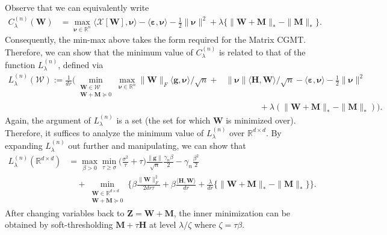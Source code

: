 \documentclass[10pt]{article}
\newcommand{\eps}{\ensuremath{\varepsilon}}
\theoremstyle{definition}
\begin{document}
Observe that we can equivalently write
\begin{align}
    C_{\lambda}^{(n)}(\bm{W}) &=  \max_{\bm{\nu} \in \mathbb{R}^{n}} \langle \mathcal{X}[\bm{W}], \bm{\nu} \rangle - \langle \bm{\eps} , \bm{\nu} \rangle - \frac{1}{2} \| \bm{\nu} \|^2 + \lambda \big\{ \| \bm{W+M} \|_{*} - \|\bm{M}\|_{*}\big\}.
\end{align}
Consequently, the min-max above takes the form required for the Matrix CGMT.  Therefore, 
we can show that the minimum value of $C_{\lambda}^{(n)}$ is related to that of the function $L_{\lambda}^{(n)}$, defined via
\begin{align}
    L_{\lambda}^{(n)}(\mathcal{W}) :=\frac{1}{dr} \bigg( \min_ {\substack{\bm{W}  \in \mathcal{W}\\ \bm{W} + \bm{M} \succcurlyeq 0}} \max_{\bm{\nu} \in \mathbb{R}^n} \| \bm{W} \|_F \langle \bm{g}, \bm{\nu} \rangle /\sqrt{n} +&\| \bm{\nu}\| \langle \bm{H}, \bm{W}
    \rangle /\sqrt{n}- \langle \bm{\eps}, \bm{\nu} \rangle - \frac{1}{2} \| \bm{\nu} \|^2 \\
    &\qquad\qquad + \lambda (\| \bm{W} + \bm{M} \|_{*} - \|\bm{M}\|_* )\bigg).
\end{align}
Again, the argument of $L_{\lambda}^{(n)}$ is a set (the set for which $\bm{W}$ is minimized over). 
Therefore, it suffices to analyze the minimum value of $L_{\lambda}^{(n)}$ over $\mathbb{R}^{d\times d}$.  By expanding $L_{\lambda}^{(n)}$ out further and manipulating, we can show that 
\begin{subequations}
\label{l_lambda_n1}    
\begin{align}
    L_{\lambda}^{(n)}(\mathbb{R}^{d\times d}) &= \max_{\beta > 0} \min_{\tau \geq \sigma} \bigg( \frac{\sigma^2}{\tau} + \tau \bigg) \frac{\|\bm{g}\|}{\sqrt{n}}\frac{\gamma_n \beta}{2} - \gamma_n \frac{\beta^2}{2} \\
    &\quad + \min_{ \substack{\bm{W} \in\mathbb{R}^{d\times d}\\\bm{W} + \bm{M} \succcurlyeq 0}} \bigg\{  \beta \frac{\|\bm{W}\|_F^2}{2 dr \tau} + \beta \frac{\langle \bm{H}, \bm{W} \rangle}{dr} + \frac{\lambda}{dr} \big\{ \| \bm{W} + \bm{M} \|_* - \|\bm{M} \|_* \big\} \bigg\}.
\end{align}
\end{subequations}
After changing variables back to $\bm{Z} = \bm{W} + \bm{M}$, the inner minimization can be obtained by soft-thresholding $\bm{M} + \tau \bm{H}$ at level $\lambda/\zeta$ where $\zeta = \tau\beta$.  
\end{document}
